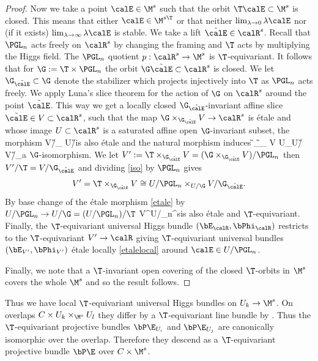 \begin{proof}
	Now we take a  point $\calE\in \M^{s}$ such that the orbit $\T\calE\subset \M^s$ is closed. This means that  either  $\calE\in \M^{s\T}$ or that  neither $\lim_{\lambda\to 0}\lambda\calE$ nor (if it exists) $\lim_{\lambda\to \infty}\lambda\calE$ is stable. We take  a lift $\tilde{\calE}\in \calR^s$. Recall that $\PGL_n$ acts freely on $\calR^s$ by changing the framing and $\T$ acts by multiplying the Higgs field. The $\PGL_n$ quotient $p:\calR^s\to \M^s$ is $\T$-equivariant. It follows  that for $\G:=\T\times \PGL_n$ the orbit $\G\tilde{\calE}\subset \calR^s$ is closed. We let $\G_{\tilde{\calE}}\subset \G$ denote the stabilizer which projects injectively into $\T$ as $\PGL_n$ acts freely.  We apply Luna's slice theorem \cite[Theorem III.1]{luna} for the action of $\G$ on $\calR^s$ around the point $\tilde{\calE}$. This way we get a locally closed $\G_{\tilde{\calE}}$-invariant affine slice $\tilde{\calE} \in V\subset \calR^s$, such that the map  $\G\times_{\G_{\tilde{\calE}}} V \to \calR^s$ is \'etale and whose image $U\subset \calR^s$ is  a saturated affine open $\G$-invariant subset, the morphism \beq \label{etale}V/\G_{\tilde{\calE}} \to U/\G\eeq is also \'etale and the natural morphism induces \beq \label{iso}\G\times_{\G_{\tilde{\calE}}} V \cong U\times_{U/\G} V/\G_{\tilde{\calE}}\eeq a $\G$-isomorphism.  We let $V^\prime:=\T\times_{\G_{\tilde{\calE}}}V=(\G\times_{\G_{\tilde{\calE}}}V)/\PGL_n$ then $V^\prime/\T=V/\G_{\tilde{\calE}}$ and dividing \eqref{iso} by $\PGL_n$ gives $$V^\prime=\T\times_{\G_{\tilde{\calE}}} V\cong U/\PGL_n\times_{U/\G} V/\G_{\tilde{\calE}}.$$ By base change of the \'etale morphism \eqref{etale}  by $U/{\PGL_n}\to U/\G=(U/\PGL_n)/\T$  \beq\label{etalelocal}V^\prime \to U/\PGL_n\subset \M^s\eeq is also \'etale and $\T$-equivariant. Finally, the $\T$-equivariant universal Higgs bundle $(\bE_\calR,\bPhi_{\calR})$ restricts to the $\T$-equivariant $V^\prime\to  \calR$ giving  $\T$-equivariant universal bundles $(\bE_{V^\prime},\bPhi_{V^\prime})$ \'etale locally \eqref{etalelocal} around $\calE\in U/\PGL_n$.

	Finally, we note that a $\T$-invariant open covering of the closed $\T$-orbits in $\M^s$ covers the whole $\M^s$ and so the result follows.

\end{proof}

Thus we have local $\T$-equivariant universal Higgs bundles on $U_k\to \M^s$. On overlaps $C\times U_k\times_{\M^s} U_l$ they differ by a $\T$-equivariant line bundle by \cite[(4.2)]{hausel-thaddeus}. Thus the $\T$-equivariant projective bundles $\bP\E_{U_i}$ and $\bP\E_{U_j}$ are canonically isomorphic over the overlap. Therefore they descend as a $\T$-equivariant projective bundle $\bP\E$ over $C\times \M^s$.

